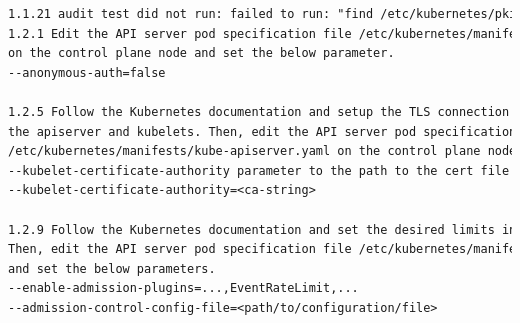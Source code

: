 \begin{lstlisting}[language=tex, caption={Remediations master van kube-bench}]
1.1.21 audit test did not run: failed to run: "find /etc/kubernetes/pki/ -name '*.key' | xargs stat -c permissions=%a", output: "find: /etc/kubernetes/pki/: No such file or directory\nBusyBox v1.35.0 (2022-11-19 10:13:10 UTC) multi-call binary.\n\nUsage: stat [-ltf] [-c FMT] FILE...\n\nDisplay file (default) or filesystem status\n\n\t-c FMT\tUse the specified format\n\t-f\tDisplay filesystem status\n\t-L\tFollow links\n\t-t\tTerse display\n\nFMT sequences for files:\n %a\tAccess rights in octal\n %A\tAccess rights in human readable form\n %b\tNumber of blocks allocated (see %B)\n %B\tSize in bytes of each block reported by %b\n %d\tDevice number in decimal\n %D\tDevice number in hex\n %f\tRaw mode in hex\n %F\tFile type\n %g\tGroup ID\n %G\tGroup name\n %h\tNumber of hard links\n %i\tInode number\n %n\tFile name\n %N\tFile name, with -> TARGET if symlink\n %o\tI/O block size\n %s\tTotal size in bytes\n %t\tMajor device type in hex\n %T\tMinor device type in hex\n %u\tUser ID\n %U\tUser name\n %x\tTime of last access\n %X\tTime of last access as seconds since Epoch\n %y\tTime of last modification\n %Y\tTime of last modification as seconds since Epoch\n %z\tTime of last change\n %Z\tTime of last change as seconds since Epoch\n\nFMT sequences for file systems:\n %a\tFree blocks available to non-superuser\n %b\tTotal data blocks\n %c\tTotal file nodes\n %d\tFree file nodes\n %f\tFree blocks\n %i\tFile System ID in hex\n %l\tMaximum length of filenames\n %n\tFile name\n %s\tBlock size (for faster transfer)\n %S\tFundamental block size (for block counts)\n %t\tType in hex\n %T\tType in human readable form\n", error: exit status 123
1.2.1 Edit the API server pod specification file /etc/kubernetes/manifests/kube-apiserver.yaml
on the control plane node and set the below parameter.
--anonymous-auth=false

1.2.5 Follow the Kubernetes documentation and setup the TLS connection between
the apiserver and kubelets. Then, edit the API server pod specification file
/etc/kubernetes/manifests/kube-apiserver.yaml on the control plane node and set the
--kubelet-certificate-authority parameter to the path to the cert file for the certificate authority.
--kubelet-certificate-authority=<ca-string>

1.2.9 Follow the Kubernetes documentation and set the desired limits in a configuration file.
Then, edit the API server pod specification file /etc/kubernetes/manifests/kube-apiserver.yaml
and set the below parameters.
--enable-admission-plugins=...,EventRateLimit,...
--admission-control-config-file=<path/to/configuration/file>


\end{lstlisting}
